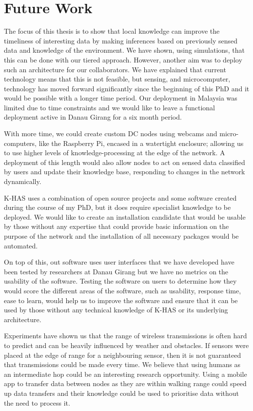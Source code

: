 \section{Future Work}
The focus of this thesis is to show that local knowledge can improve the timeliness of interesting data by making inferences based on previously sensed data and knowledge of the environment. We have shown, using simulations, that this can be done with our tiered approach. However, another aim was to deploy such an architecture for our collaborators. We have explained that current technology means that this is not feasible, but sensing, and microcomputer, technology has moved forward significantly since the beginning of this PhD and it would be possible with a longer time period. Our deployment in Malaysia was limited due to time constraints and we would like to leave a functional deployment active in Danau Girang for a six month period. 

With more time, we could create custom DC nodes using webcams and micro-computers, like the Raspberry Pi, encased in a watertight enclosure; allowing us to use higher levels of knowledge-processing at the edge of the network. A deployment of this length would also allow nodes to act on sensed data classified by users and update their knowledge base, responding to changes in the network dynamically.

K-HAS uses a combination of open source projects and some software created during the course of my PhD, but it does require specialist knowledge to be deployed. We would like to create an installation candidate that would be usable by those without any expertise that could provide basic information on the purpose of the network and the installation of all necessary packages would be automated.

On top of this, out software uses user interfaces that we have developed have been tested by researchers at Danau Girang but we have no metrics on the usability of the software. Testing the software on users to determine how they would score the different areas of the software, such as usability, response time, ease to learn, would help us to improve the software and ensure that it can be used by those without any technical knowledge of K-HAS or its underlying architecture.

Experiments have shown us that the range of wireless transmissions is often hard to predict and can be heavily influenced by weather and obstacles. If sensors were placed at the edge of range for a neighbouring sensor, then it is not guaranteed that transmissions could be made every time. We believe that using humans as an intermediate hop could be an interesting research opportunity. Using a mobile app to transfer data between nodes as they are within walking range could speed up data transfers and their knowledge could be used to prioritise data without the need to process it.

